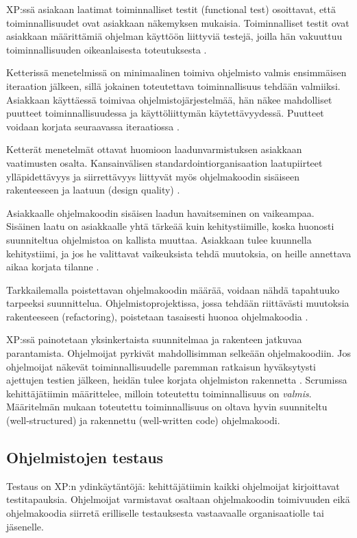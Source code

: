 \documentclass[finnish]{tktltiki2}
\theoremstyle{definition}
\theoremstyle{remark}
\begin{document}
XP:ssä asiakaan laatimat toiminnalliset testit (functional test) osoittavat, että toiminnallisuudet ovat asiakkaan näkemyksen mukaisia. Toiminnalliset testit ovat asiakkaan määrittämiä ohjelman käyttöön liittyviä testejä, joilla hän vakuuttuu toiminnallisuuden oikeanlaisesta toteutuksesta \cite{BEC99}.

Ketterissä menetelmissä on minimaalinen toimiva ohjelmisto valmis ensimmäisen iteraation jälkeen, sillä jokainen toteutettava toiminnallisuus tehdään valmiiksi. Asiakkaan käyttäessä toimivaa ohjelmisto\-järjestelmää, hän näkee mahdolliset puutteet toiminnallisuudessa ja käyttö\-liittymän käy\-tettävyydessä. Puutteet voidaan korjata seuraavassa iteraatiossa \cite{BEC99}.

Ketterät menetelmät ottavat huomioon laadunvarmistuksen asiakkaan vaatimusten osalta. Kansainvälisen standardointiorganisaation laatupiirteet ylläpidettävyys ja siirrettävyys liittyvät myös ohjelmakoodin sisäiseen rakenteeseen ja laatuun (design quality) \cite{KIP96}.

Asiakkaalle ohjelmakoodin sisäisen laadun havaitseminen on vaikeampaa. Sisäinen laatu on asiakkaalle yhtä tärkeää kuin kehitystiimille, koska huonosti suunniteltua ohjelmistoa on kallista muuttaa. Asiakkaan tulee kuunnella kehitystiimi, ja jos he valittavat vaikeuksista tehdä muutoksia, on heille annettava aikaa korjata tilanne \cite{FOW01b}.

Tarkkailemalla poistettavan ohjelmakoodin määrää, voidaan nähdä tapahtuuko tarpeeksi suunnittelua. Ohjelmistoprojektissa, jossa tehdään riittävästi muutoksia rakenteeseen (refactoring), poistetaan tasaisesti huonoa ohjelmakoodia \cite{FOW01b}.

XP:ssä painotetaan yksinkertaista suunnitelmaa ja rakenteen jatkuvaa parantamista. Ohjelmoijat pyrkivät mahdollisimman selkeään ohjelmakoodiin. Jos ohjelmoijat näkevät toiminnallisuudelle paremman ratkaisun hyväksytysti ajettujen testien jälkeen, heidän tulee korjata ohjelmiston rakennetta \cite{BEC99}.
Scrumissa kehittäjätiimin määrittelee, milloin toteutettu toiminnallisuus on \textit{valmis}. Määritelmän mukaan toteutettu toiminnallisuus on oltava hyvin suunniteltu (well-structured) ja rakennettu (well-written code) ohjelmakoodi\cite{SCH09}.


\subsection{Ohjelmistojen testaus}

Testaus on XP:n ydinkäytäntöjä: kehittäjätiimin kaikki ohjelmoijat kirjoittavat testitapauksia. Ohjelmoijat varmistavat osaltaan ohjelmakoodin toimivuuden eikä ohjelmakoodia siirretä erilliselle testauksesta vastaavaalle organisaatiolle tai jäsenelle.
\end{document}
